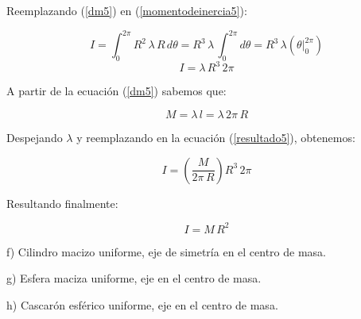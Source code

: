 \documentclass[letter,11pt]{article}
\begin{document}
Reemplazando (\ref{dm5}) en (\ref{momentodeinercia5}):

\begin{equation*}
    I = \int_{0}^{2\pi} R^2\, \lambda\, R\, d\theta = R^3\, \lambda\, \int_{0}^{2\pi} d\theta = R^3\, \lambda (\theta \Biggr|_{0}^{2\pi})
\end{equation*}
\begin{equation}
    I = \lambda\, R^3\, 2\pi
\label{resultado5}
\end{equation}

A partir de la ecuación (\ref{dm5}) sabemos que:

\begin{equation*}
    M = \lambda\, l = \lambda\, 2\pi\, R
\end{equation*}

Despejando $\lambda$ y reemplazando en la ecuación (\ref{resultado5}), obtenemos:

\begin{equation*}
    I = \left( \frac{M}{2\pi\, R} \right) R^3\, 2\pi
\end{equation*}

Resultando finalmente:

\begin{equation}
    I = M\, R^2
\end{equation}

\newpage
f) Cilindro macizo uniforme, eje de simetría en el centro de masa.

\newpage
g) Esfera maciza uniforme, eje en el centro de masa.

\newpage
h) Cascarón esférico uniforme, eje en el centro de masa.
\end{document}
